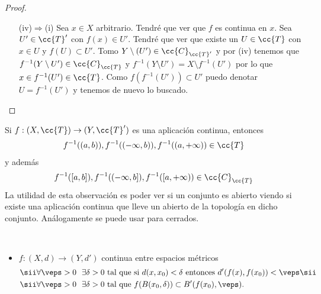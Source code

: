 \begin{prop}
\begin{proof}
\begin{enumerate}
            \item[(iv)$\Rightarrow$(i)] Sea $x\in X$ arbitrario. Tendré que ver que $f$ es continua en $x$. Sea $U'\in \cc{T}'$ con $f(x)\in U'$. Tendré que ver que existe un $U\in \cc{T}$ con $x\in U$ y $f(U)\subset U'$. Tomo $Y\setminus(U')\in \cc{C}_{\cc{T}'}$ y por (iv) tenemos que $f^{-1}(Y\setminus U')\in \cc{C}_{\cc{T}}$ y $f^{-1}(Y\setminus U') = X \setminus f^{-1}(U')$ por lo que $x\in f^{-1}(U')\in \cc{T}$. Como $f(f^{-1}(U'))\subset U'$ puedo denotar $U = f^{-1}(U')$ y tenemos de nuevo lo buscado. 
        \end{enumerate}
    \end{proof}
\end{prop}

\begin{observacion}
    Si $f: (X, \cc{T}) \to (Y, \cc{T}')$ es una aplicación continua, entonces 
    \begin{gather*}
        f^{-1}((a,b)), f^{-1}((-\infty, b)), f^{-1}((a, +\infty))\in \cc{T}
    \end{gather*}
    y además 
    \begin{gather*}
        f^{-1}([a,b]), f^{-1}((-\infty, b]), f^{-1}([a, +\infty))\in \cc{C}_{\cc{T}}
    \end{gather*}
    La utilidad de esta observación es poder ver si un conjunto es abierto viendo si existe una aplicación continua que lleve un abierto de la topología en dicho conjunto. Análogamente se puede usar para cerrados.
    \endsquare
\end{observacion}

\begin{ejemplo}\
    \begin{itemize}
        \item $f:(X, d) \to (Y, d')$ continua entre espacios métricos 
        \begin{align*}
            \sii &\forall \veps >0\ \ \exists \delta >0 \text{ tal que si } d(x, x_0)<\delta \text{ entonces } d'(f(x), f(x_0))<\veps \sii\\
            \sii &\forall \veps >0 \ \ \exists \delta >0 \text{ tal que } f(B(x_0, \delta))\subset B'(f(x_0), \veps).
        \end{align*}
    \end{itemize}
\end{ejemplo}

